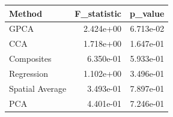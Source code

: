 \begin{tabular}{lrr}
\toprule
Method & F_statistic & p_value \\
\midrule
GPCA & 2.424e+00 & 6.713e-02 \\
CCA & 1.718e+00 & 1.647e-01 \\
Composites & 6.350e-01 & 5.933e-01 \\
Regression & 1.102e+00 & 3.496e-01 \\
Spatial Average & 3.493e-01 & 7.897e-01 \\
PCA & 4.401e-01 & 7.246e-01 \\
\bottomrule
\end{tabular}
